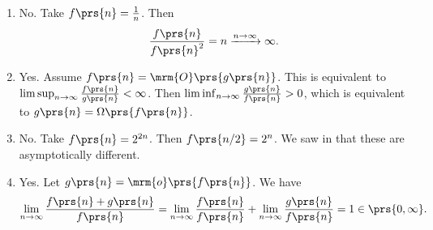 \documentclass[oneside]{scrbook}
\theoremstyle{definition}
\begin{document}
\begin{problem}
\begin{enumerate}[label=\alph*.]
\item No. Take $f\prs{n} = \frac{1}{n}$. Then
\begin{align*}
    \frac{f\prs{n}}{f\prs{n}^2} = n \xrightarrow{n \to \infty} \infty \text{.}
\end{align*}
\item Yes. Assume $f\prs{n} = \mrm{O}\prs{g\prs{n}}$. This is equivalent to $\limsup_{n \to \infty} \frac{f\prs{n}}{g\prs{n}} < \infty$. Then $\liminf_{n \to \infty} \frac{g\prs{n}}{f\prs{n}} > 0$, which is equivalent to $g\prs{n} = \Omega\prs{f\prs{n}}$.
\item No. Take $f\prs{n} = 2^{2n}$. Then $f\prs{n/2} = 2^n$. We saw in  that these are asymptotically different.
\item Yes. Let $g\prs{n} = \mrm{o}\prs{f\prs{n}}$. We have
\begin{align*}
    \lim_{n\to\infty} \frac{f\prs{n} + g\prs{n}}{f\prs{n}} = \lim_{n\to\infty} \frac{f\prs{n}}{f\prs{n}} + \lim_{n\to\infty} \frac{g\prs{n}}{f\prs{n}} = 1 \in \prs{0,\infty} \text{.}
\end{align*}
\end{enumerate}
\end{problem}
\end{document}
